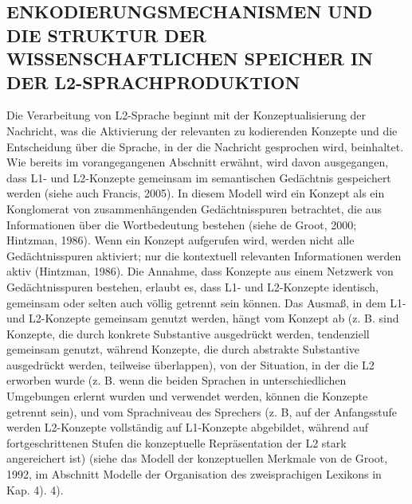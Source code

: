 \documentclass[
  letterpaper,
]{scrbook}
\begin{document}
\hypertarget{enkodierungsmechanismen-und-die-struktur-der-wissenschaftlichen-speicher-in-der-l2-sprachproduktion}{%
\subsection{ENKODIERUNGSMECHANISMEN UND DIE STRUKTUR DER
WISSENSCHAFTLICHEN SPEICHER IN DER
L2-SPRACHPRODUKTION}\label{enkodierungsmechanismen-und-die-struktur-der-wissenschaftlichen-speicher-in-der-l2-sprachproduktion}}

Die Verarbeitung von L2-Sprache beginnt mit der Konzeptualisierung der
Nachricht, was die Aktivierung der relevanten zu kodierenden Konzepte
und die Entscheidung über die Sprache, in der die Nachricht gesprochen
wird, beinhaltet. Wie bereits im vorangegangenen Abschnitt erwähnt, wird
davon ausgegangen, dass L1- und L2-Konzepte gemeinsam im semantischen
Gedächtnis gespeichert werden (siehe auch Francis, 2005). In diesem
Modell wird ein Konzept als ein Konglomerat von zusammenhängenden
Gedächtnisspuren betrachtet, die aus Informationen über die
Wortbedeutung bestehen (siehe de Groot, 2000; Hintzman, 1986). Wenn ein
Konzept aufgerufen wird, werden nicht alle Gedächtnisspuren aktiviert;
nur die kontextuell relevanten Informationen werden aktiv (Hintzman,
1986). Die Annahme, dass Konzepte aus einem Netzwerk von
Gedächtnisspuren bestehen, erlaubt es, dass L1- und L2-Konzepte
identisch, gemeinsam oder selten auch völlig getrennt sein können. Das
Ausmaß, in dem L1- und L2-Konzepte gemeinsam genutzt werden, hängt vom
Konzept ab (z. B. sind Konzepte, die durch konkrete Substantive
ausgedrückt werden, tendenziell gemeinsam genutzt, während Konzepte, die
durch abstrakte Substantive ausgedrückt werden, teilweise überlappen),
von der Situation, in der die L2 erworben wurde (z. B. wenn die beiden
Sprachen in unterschiedlichen Umgebungen erlernt wurden und verwendet
werden, können die Konzepte getrennt sein), und vom Sprachniveau des
Sprechers (z. B, auf der Anfangsstufe werden L2-Konzepte vollständig auf
L1-Konzepte abgebildet, während auf fortgeschrittenen Stufen die
konzeptuelle Repräsentation der L2 stark angereichert ist) (siehe das
Modell der konzeptuellen Merkmale von de Groot, 1992, im Abschnitt
Modelle der Organisation des zweisprachigen Lexikons in Kap. 4). 4).
\end{document}
